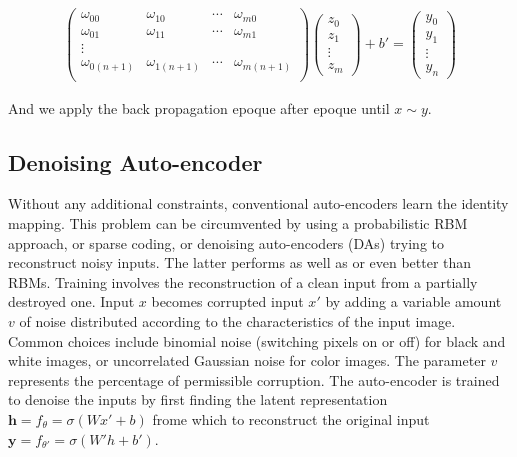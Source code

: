 \documentclass[final, paper=letter,5p,times,twocolumn]{elsarticle}
\begin{document}
\begin{eqnarray*}
  \left(
  \begin{array}{cccc}
    \omega_{00} & \omega_{10} & \cdots & \omega_{m0} \\
    \omega_{01} & \omega_{11} & \cdots & \omega_{m1} \\
    \vdots \\
    \omega_{0(n+1)} & \omega_{1(n+1)} & \cdots & \omega_{m(n+1)} \\
  \end{array}
  \right) \left(
  \begin{array}{c}
    z_{0} \\
    z_{1} \\
    \vdots \\
    z_{m} 
  \end{array}
  \right) + b' = \left(
  \begin{array}{c}
    y_{0} \\
    y_{1} \\
    \vdots \\
    y_{n} 
  \end{array}
  \right)
\end{eqnarray*}

And we apply the back propagation epoque after epoque until $x \sim y$.

\subsection{Denoising Auto-encoder}

Without any additional constraints, conventional auto-encoders learn the identity mapping. This problem can be circumvented by using a probabilistic RBM approach, or sparse coding, or denoising auto-encoders (DAs) trying to reconstruct noisy inputs. The latter performs as well as or even better than RBMs. Training involves the reconstruction of a clean input from a partially destroyed one. Input $x$ becomes corrupted input $x'$ by adding a variable amount $v$ of noise distributed according to the characteristics of the input image. Common choices include binomial noise (switching pixels on or off) for black and white images, or uncorrelated Gaussian noise for color images. The parameter $v$ represents the percentage of permissible corruption. The auto-encoder is trained to denoise the inputs by first finding the latent representation $\bm{h} = f_{\theta} = \sigma(Wx' + b)$ frome which to reconstruct the original input $\bm{y} = f_{\theta'} = \sigma( W'h + b')$.
\end{document}
